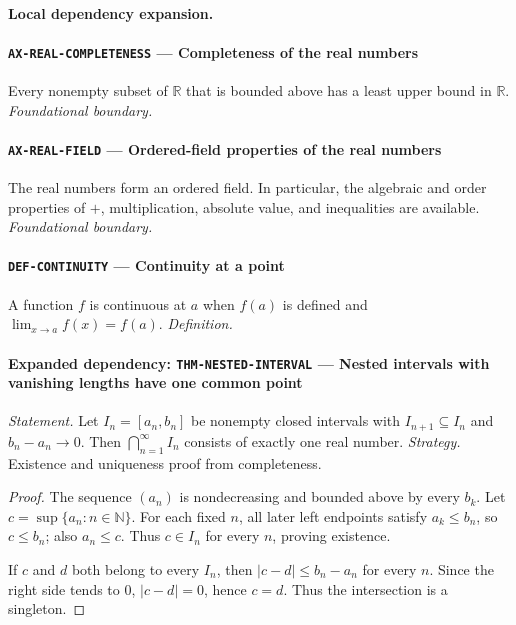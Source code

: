\documentclass[10pt]{article}
\newcommand{\pidraw}[1]{\begingroup\urlstyle{tt}\nolinkurl{#1}\endgroup}
\theoremstyle{definition}
\theoremstyle{remark}
\begin{document}
\paragraph{Local dependency expansion.}

\paragraph{\pidraw{AX-REAL-COMPLETENESS} --- Completeness of the real numbers}
Every nonempty subset of $\mathbb{R}$ that is bounded above has a least upper bound in $\mathbb{R}$.
\textit{Foundational boundary.}

\paragraph{\pidraw{AX-REAL-FIELD} --- Ordered-field properties of the real numbers}
The real numbers form an ordered field. In particular, the algebraic and order properties of $+$, multiplication, absolute value, and inequalities are available.
\textit{Foundational boundary.}

\paragraph{\pidraw{DEF-CONTINUITY} --- Continuity at a point}
A function $f$ is continuous at $a$ when $f(a)$ is defined and $\lim_{x\to a}f(x)=f(a)$.
\textit{Definition.}

\paragraph{Expanded dependency: \pidraw{THM-NESTED-INTERVAL} --- Nested intervals with vanishing lengths have one common point}
\textit{Statement.} Let $I_n=[a_n,b_n]$ be nonempty closed intervals with
$I_{n+1}\subseteq I_n$ and $b_n-a_n\to0$. Then
$\bigcap_{n=1}^\infty I_n$ consists of exactly one real number.
\textit{Strategy.} Existence and uniqueness proof from completeness.
\begin{proof}The sequence $(a_n)$ is nondecreasing and bounded above by every $b_k$.
Let $c=\sup\{a_n:n\in\mathbb N\}$. For each fixed $n$, all later left
endpoints satisfy $a_k\le b_n$, so $c\le b_n$; also $a_n\le c$. Thus
$c\in I_n$ for every $n$, proving existence.

If $c$ and $d$ both belong to every $I_n$, then
$|c-d|\le b_n-a_n$ for every $n$. Since the right side tends to $0$,
$|c-d|=0$, hence $c=d$. Thus the intersection is a singleton.\end{proof}
\end{document}
